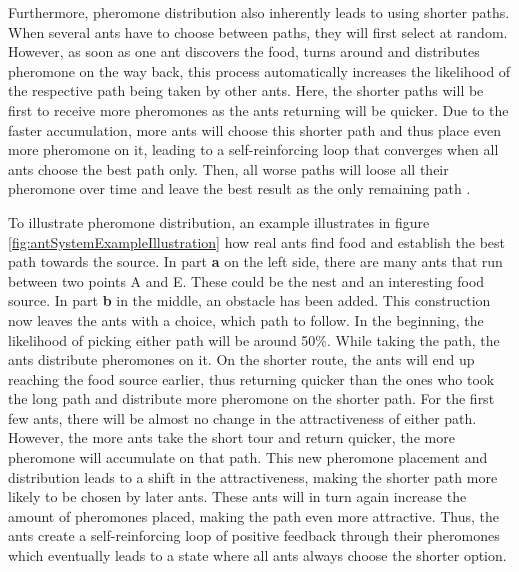 Furthermore, pheromone distribution also inherently leads to using shorter paths. 
When several ants have to choose between paths, they will first select at random.
However, as soon as one ant discovers the food, turns around and distributes pheromone on the way back, this process automatically increases the likelihood of the respective path being taken by other ants.
Here, the shorter paths will be first to receive more pheromones as the ants returning will be quicker.
Due to the faster accumulation, more ants will choose this shorter path and thus place even more pheromone on it, leading to a self-reinforcing loop that converges when all ants choose the best path only.
Then, all worse paths will loose all their pheromone over time and leave the best result as the only remaining path \cite{gendreau_handbook_2010, dorigo_ant_1996}.

To illustrate pheromone distribution, an example illustrates in figure \ref{fig:antSystemExampleIllustration} how real ants find food and establish the best path towards the source. 
In part \textbf{a} on the left side, there are many ants that run between two points A and E. 
These could be the nest and an interesting food source.
In part \textbf{b} in the middle, an obstacle has been added.
This construction now leaves the ants with a choice, which path to follow. 
In the beginning, the likelihood of picking either path will be around 50\%.
While taking the path, the ants distribute pheromones on it. 
On the shorter route, the ants will end up reaching the food source earlier, thus returning quicker than the ones who took the long path and distribute more pheromone on the shorter path.
For the first few ants, there will be almost no change in the attractiveness of either path.
However, the more ants take the short tour and return quicker, the more pheromone will accumulate on that path.
This new pheromone placement and distribution leads to a shift in the attractiveness, making the shorter path more likely to be chosen by later ants.
These ants will in turn again increase the amount of pheromones placed, making the path even more attractive.
Thus, the ants create a self-reinforcing loop of positive feedback through their pheromones which eventually leads to a state where all ants always choose the shorter option.


